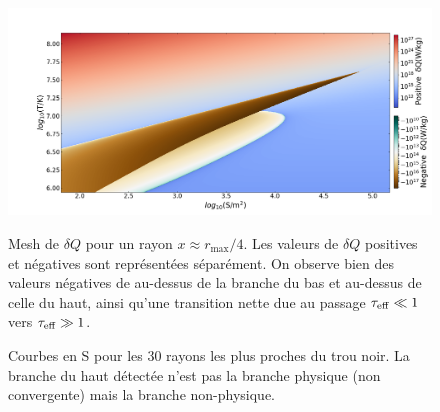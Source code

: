 \documentclass[a4paper,12pt]{article}
\begin{document}
  \begin{figure}[hb]
    \centering
    \includegraphics[width=0.9\linewidth]{Space_pos_neg}
    \caption{Mesh de $\delta Q$ pour un rayon $x \approx r_{\max}/4$. Les valeurs de $\delta Q$ positives et négatives sont représentées séparément. On observe bien des valeurs négatives de au-dessus de la branche du bas et au-dessus de celle du haut, ainsi qu'une transition nette due au passage $\tau_{\rm{eff}} \ll 1$ vers $\tau_{\rm{eff}} \gg 1$.}
    
    \vspace{20pt}
    
    \hspace{5pt}
    \caption{Courbes en S pour les 30 rayons les plus proches du trou noir. La branche du haut détectée n'est pas la branche physique (non convergente) mais la branche non-physique.}
    \label{Fig:Curves}
  \end{figure}
    
\end{document}
